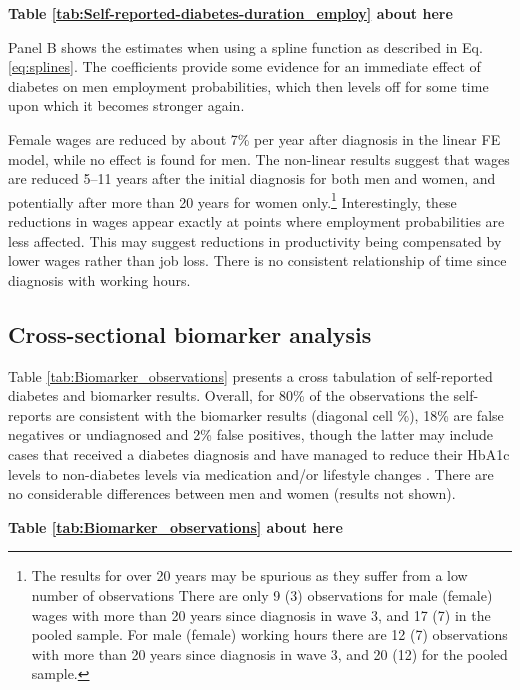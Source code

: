 \documentclass[12pt,english]{article}
\begin{document}
\begin{center}
	\textbf{Table \ref{tab:Self-reported-diabetes-duration_employ} about here}
\end{center}


Panel B shows the estimates when using a spline function as described in Eq. \ref{eq:splines}. The coefficients provide some evidence for an immediate effect of diabetes on men employment probabilities, which then levels off for some time upon which it becomes stronger again.

Female wages are reduced by about 7\% per year after diagnosis in the linear \ac{FE} model, while no effect is found for men. The non-linear results suggest that wages are reduced 5--11 years after the initial diagnosis for both men and women, and potentially after more than 20 years for women only.\footnote{The results for over 20 years may be spurious as they suffer from a low number of observations There are only 9 (3) observations for male (female) wages with more than 20 years since diagnosis in wave 3, and 17 (7) in the pooled sample. For male (female) working hours there are 12 (7) observations with more than 20 years since diagnosis in wave 3, and 20 (12) for the pooled sample.} Interestingly, these reductions in wages appear exactly at points where employment probabilities are less affected. This may suggest reductions in productivity being compensated by lower wages rather than job loss. There is no consistent relationship of time since diagnosis with working hours.


\FloatBarrier

\subsection{Cross-sectional biomarker analysis}


Table \ref{tab:Biomarker_observations} presents a cross tabulation of self-reported diabetes and biomarker results. Overall, for 80\% of the observations the self-reports are consistent with the biomarker results (diagonal cell \%), 18\% are false negatives or undiagnosed and 2\% false positives, though the latter may include cases that received a diabetes diagnosis and have managed to reduce their \ac{HbA1c} levels to non-diabetes levels via medication and/or lifestyle changes \parencite{Flores-Hernandez2015}.  There are no considerable differences between men and women (results not shown). 

\begin{center}
	\textbf{Table \ref{tab:Biomarker_observations} about here}
\end{center}
\end{document}
